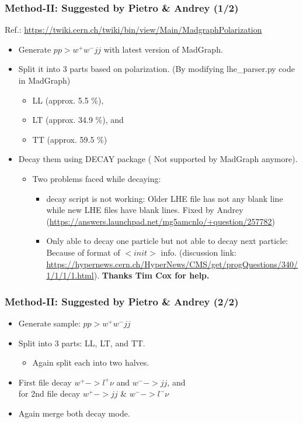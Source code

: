 \documentclass[slidestop,compress,mathserif]{beamer}
\begin{document}
\begin{frame}\frametitle{Method-II: Suggested by Pietro \& Andrey (1/2)}
  Ref.: {\color{blue} \url{https://twiki.cern.ch/twiki/bin/view/Main/MadgraphPolarization}}
  \begin{itemize}
    \item Generate $p p > w^+w^- j j$ with latest version of MadGraph.
    \item Split it into 3 parts based on polarization. (By modifying lhe\_parser.py code in MadGraph)
      \begin{itemize}
	\item LL (approx. 5.5 \%),
	\item LT (approx. 34.9 \%), and
	\item TT (approx. 59.5 \%)
      \end{itemize}
    \item Decay them using DECAY package ({\color{red} Not supported by MadGraph anymore}).
      \begin{itemize}
	\item Two problems faced while decaying:
	  \begin{itemize}
	    \item decay script is not working: Older LHE file has not any blank line while new LHE files have blank lines. Fixed by Andrey (\url{https://answers.launchpad.net/mg5amcnlo/+question/257782})
	    \item Only able to decay one particle but not able to decay next particle: Because of format of $<init>$ info. (discussion link: \url{https://hypernews.cern.ch/HyperNews/CMS/get/progQuestions/340/1/1/1/1.html}). {\bf Thanks Tim Cox for help.}
	  \end{itemize}
      \end{itemize}
  \end{itemize}
\end{frame}


\begin{frame}\frametitle{Method-II: Suggested by Pietro \& Andrey (2/2)}
  \vfill
  \begin{itemize}
    \item Generate sample: $ p p > w^+w^- j  j$
  \vfill
    \item Split into 3 parts: LL, LT, and TT.
  \vfill
      \begin{itemize}
	    \item Again split each into two halves.
  \vfill
	\end{itemize}
    \item First file decay $w^+->l^+\nu$ and $w^-->jj$, and \\for 2nd file decay $w^+->jj $ \& $w^-->l^-\nu$
  \vfill
    \item Again merge both decay mode.
  \end{itemize}
  \vfill
\end{frame}
\end{document}
